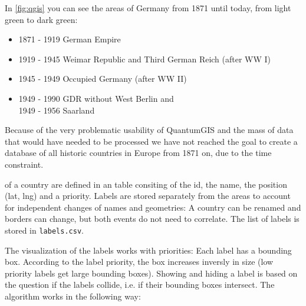 In \ref{fig:qgis} you can see the areas of Germany from 1871 until today, from light green to dark green:

\begin{itemize}
  \item 1871 - 1919 German Empire
  \item 1919 - 1945 Weimar Republic and Third German Reich (after WW I)
  \item 1945 - 1949 Occupied Germany (after WW II)
  \item 1949 - 1990 GDR without West Berlin and \\
        1949 - 1956 Saarland
\end{itemize}

Because of the very problematic usability of QuantumGIS and the mass of data that would have needed to be processed we have not reached the goal to create a database of all historic countries in Europe from 1871 on, due to the time constraint.

of a country are defined in an table consiting of the id, the name, the position (lat, lng) and a priority. Labels are stored separately from the areas to account for independent changes of names and geometries: A country can be renamed and borders can change, but both events do not need to correlate. The list of labels is stored in \texttt{labels.csv}.

\newpage
The visualization of the labels works with priorities: Each label has a bounding box. According to the label priority, the box increases inversly in size (low priority labels get large bounding boxes). Showing and hiding a label is based on the question if the labels collide, i.e. if their bounding boxes intersect. The algorithm works in the following way:

